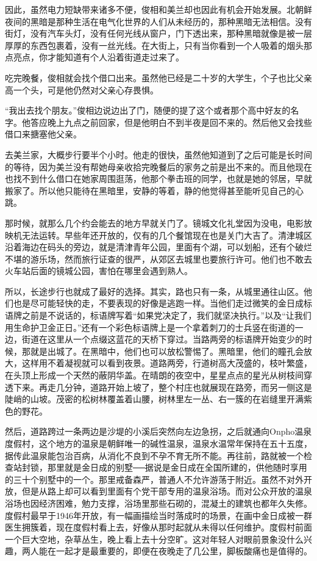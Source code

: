 因此，虽然电力短缺带来诸多不便，俊相和美兰却也因此有机会开始发展。北朝鲜夜间的黑暗是那种生活在电气化世界的人们从未经历的，那种黑暗无法相信。没有街灯，没有汽车头灯，没有任何光线从窗户，门下透出来，那种黑暗就像是被一层厚厚的东西包裹着，没有一丝光线。在大街上，只有当你看到一个人吸着的烟头那点亮点，你才能知道有个人沿着街道走过来了。

吃完晚餐，俊相就会找个借口出来。虽然他已经是二十岁的大学生，个子也比父亲高一个头，可是他仍然对父亲心存畏惧。

“我出去找个朋友。”俊相边说边出了门，随便的提了这个或者那个高中好友的名字。他答应晚上九点之前回家，但是他明白不到半夜是回不来的。然后他又会找些借口来搪塞他父亲。

去美兰家，大概步行要半个小时。他走的很快，虽然他知道到了之后可能是长时间的等待，因为美兰没有帮她母亲收拾完晚餐后的家务之前是出不来的。而且他现在也找不到什么借口在她家周围逛荡，他那个拳击班的同学，也就是她的邻居，早就搬家了。所以他只能待在黑暗里，安静的等着，静的他觉得甚至能听见自己的心跳。

那时候，就那么几个约会能去的地方早就关门了。镜城文化礼堂因为没电，电影放映机无法运转。早些年还开放的，仅有的几个餐馆现在也是关门大吉了。清津城区沿着海边在码头的旁边，就是清津青年公园，里面有个湖，可以划船，还有个破烂不堪的游乐场，然而旅行证查的很严，从郊区去城里也要旅行许可。他们也不敢去火车站后面的镜城公园，害怕在哪里会遇到熟人。

所以，长途步行也就成了最好的选择。其实，路也只有一条，从城里通往山区。他们也是尽可能轻快的走，不要表现的好像是逃跑一样。当他们走过微笑的金日成标语牌之前是不说话的，标语牌写着“如果党决定了，我们就坚决执行。”以及“让我们用生命护卫金正日。”还有一个彩色标语牌上是一个拿着刺刀的士兵竖在街道的一边，街道在这里从一个点缀这蓝花的天桥下穿过。当路两旁的标语牌开始变少的时候，那就是出城了。在黑暗中，他们也可以放松警惕了。黑暗里，他们的瞳孔会放大，这样用不着凝视就可以看到夜景。道路两旁，行道树高大茂盛的，枝叶繁盛，在头顶上形成一个天然的蔽阴华盖。在晴朗的夜空中，星星点点的星光从树枝间穿透下来。再走几分钟，道路开始上坡了，整个村庄也就展现在路旁，而另一侧这是陡峭的山坡。茂密的松树林覆盖着山腰，树林里左一丛、右一簇的在岩缝里开满紫色的野花。

然后，道路跨过一条两边是沙堤的小溪后突然向左边急拐，之后就通向Onpho温泉度假村，这个地方的温泉是朝鲜唯一的碱性温泉，温泉水温常年保持在五十五度，据传此温泉能包治百病，从消化不良到不孕不育无所不能。再往前，路就被一个检查站封锁，那里就是金日成的别墅──据说是金日成在全国所建的，供他随时享用的三十个别墅中的一个。那里戒备森严，普通人不允许游荡于附近。虽然不对外开放，但是从路上却可以看到里面有个党干部专用的温泉浴场。而对公众开放的温泉浴场也因经济困难，勉力支撑，浴场里那些石砌的，混凝土的建筑也都年久失修。度假村最早于1946年开放，有一幅画描绘当时落成时的场景，在画中金日成被一群医生拥簇着，现在度假村看上去，好像从那时起就从未得以任何维护。度假村前面一个巨大空地，杂草丛生，晚上看上去十分空旷。这对年轻人对眼前景象没什么兴趣，两人能在一起才是最重要的，即便在夜晚走了几公里，脚板酸痛也是值得的。

